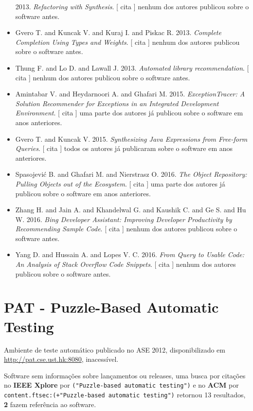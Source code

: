\begin{itemize}
      2013.
        \textit{ Refactoring with Synthesis}.
      [
          cita
      ]
nenhum dos autores publicou sobre o software antes.
\item Gvero T. and Kuncak V. and Kuraj I. and Piskac R.
      2013.
        \textit{ Complete Completion Using Types and Weights}.
      [
          cita
      ]
nenhum dos autores publicou sobre o software antes.
\item Thung F. and Lo D. and Lawall J.
      2013.
        \textit{ Automated library recommendation}.
      [
          cita
      ]
nenhum dos autores publicou sobre o software antes.
\item Amintabar V. and Heydarnoori A. and Ghafari M.
      2015.
        \textit{ ExceptionTracer: A Solution Recommender for Exceptions in an Integrated Development Environment}.
      [
          cita
      ]
uma parte dos autores já publicou sobre o software em anos anteriores.
\item Gvero T. and Kuncak V.
      2015.
        \textit{ Synthesizing Java Expressions from Free-form Queries}.
      [
          cita
      ]
todos os autores já publicaram sobre o software em anos anteriores.
\item Spasojevi\'{c} B. and Ghafari M. and Nierstrasz O.
      2016.
        \textit{ The Object Repository: Pulling Objects out of the Ecosystem}.
      [
          cita
      ]
uma parte dos autores já publicou sobre o software em anos anteriores.
\item Zhang H. and Jain A. and Khandelwal G. and Kaushik C. and Ge S. and Hu W.
      2016.
        \textit{ Bing Developer Assistant: Improving Developer Productivity by Recommending Sample Code}.
      [
          cita
      ]
nenhum dos autores publicou sobre o software antes.
\item Yang D. and Hussain A. and Lopes V. C.
      2016.
        \textit{ From Query to Usable Code: An Analysis of Stack Overflow Code Snippets}.
      [
          cita
      ]
nenhum dos autores publicou sobre o software antes.
\end{itemize}
\section{PAT - Puzzle-Based Automatic Testing}

Ambiente de teste automático
publicado no ASE 2012,
disponibilizado em \url{http://pat.cse.ust.hk:8080},
inacessível.

Software sem informações sobre lançamentos ou releases,
uma busca por citações no {\bf IEEE Xplore} por
\texttt{("Puzzle-based automatic testing")}
e no {\bf ACM} por
\texttt{content.ftsec:(+"Puzzle-based automatic testing")}
retornou
13 resultados,
{\bf 2} fazem referência ao software.

